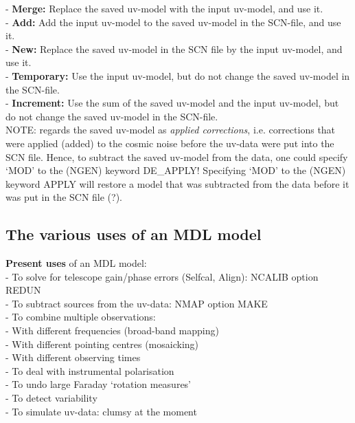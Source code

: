 - {\bf Merge:} Replace the saved uv-model with the input uv-model, 
	and use it. \\ 
- {\bf Add:} Add the input uv-model to the saved uv-model in the SCN-file, 
	and use it.\\ 
- {\bf New:} Replace the saved uv-model in the SCN file by the input uv-model, 
	and use it.\\ 
- {\bf Temporary:} Use the input uv-model, 
	but do not change the saved uv-model in the SCN-file.\\ 
- {\bf Increment:} Use the sum of the saved uv-model and the input uv-model, 
	but do not change the saved uv-model in the SCN-file. \\ 

	NOTE: \NEWSTAR regards the saved uv-model as {\em applied corrections},
i.e.  corrections that were applied (added) to the cosmic noise before the
uv-data were put into the SCN file.  Hence, to subtract the saved uv-model from
the data, one could specify `MOD' to the (NGEN) keyword DE\_APPLY! Specifying
`MOD' to the (NGEN) keyword APPLY will restore a model that was subtracted from
the data before it was put in the SCN file (?). 


\subsection{The various uses of an MDL model} 
\label{mdl.uses} 

{\bf Present uses} of an MDL model:\\ 
- To solve for telescope gain/phase errors (Selfcal, Align): 
	NCALIB option REDUN\\ 
- To subtract sources from the uv-data: NMAP option MAKE\\ 
- To combine multiple observations:\\ 
\hspace*{5mm} - With different frequencies (broad-band mapping)\\ 
\hspace*{5mm} - With different pointing centres (mosaicking)\\ 
\hspace*{5mm} - With different observing times\\ 
- To deal with instrumental polarisation\\ 
- To undo large Faraday `rotation measures'\\ 
- To detect variability \\ 
- To simulate uv-data: clumsy at the moment\\ 


